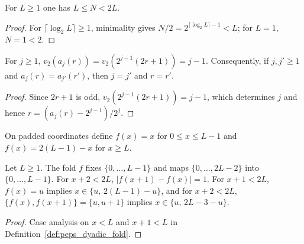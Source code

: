\begin{lemma}
    \label{lem:peps_dyadic_padded_side}
    \leanok
    For $L\ge1$ one has $L\le N<2L$.
\end{lemma}

\begin{proof}\leanok
    For $\lceil\log_2L\rceil\ge1$, minimality gives $N/2=2^{\lceil\log_2L\rceil-1}<L$; for $L=1$, $N=1<2$.
\end{proof}

\begin{lemma}
    \label{lem:peps_dyadic_anchor_valuation}
    \leanok
    For $j\ge1$, $v_2(a_j(r))=v_2(2^{j-1}(2r+1))=j-1$. Consequently, if $j,j'\ge1$ and $a_j(r)=a_{j'}(r')$, then $j=j'$ and
    $r=r'$.
\end{lemma}

\begin{proof}\leanok
    Since $2r+1$ is odd, $v_2(2^{j-1}(2r+1))=j-1$, which determines $j$ and hence $r=(a_j(r)-2^{j-1})/2^j$.
\end{proof}

\begin{definition}
    \label{def:peps_dyadic_fold}
    \leanok
    On padded coordinates define $f(x)=x$ for $0\le x\le L-1$ and
    $f(x)=2(L-1)-x$ for $x\ge L$.
\end{definition}

\begin{lemma}
    \label{lem:peps_dyadic_fold}
    \leanok
    Let $L\ge1$. The fold $f$ fixes $\{0,\ldots,L-1\}$ and maps $\{0,\ldots,2L-2\}$ into $\{0,\ldots,L-1\}$. For
    $x+2<2L$, $\lvert f(x+1)-f(x)\rvert=1$. For $x+1<2L$, $f(x)=u$ implies $x\in\{u,\,2(L-1)-u\}$, and for $x+2<2L$, $\{f(x),f(x+1)\}=\{u,u+1\}$ implies
    $x\in\{u,\,2L-3-u\}$.
\end{lemma}

\begin{proof}\leanok
    Case analysis on $x<L$ and $x+1<L$ in Definition~\ref{def:peps_dyadic_fold}.
\end{proof}

